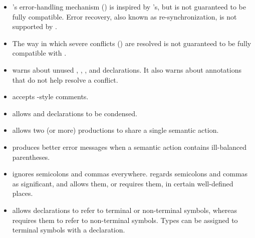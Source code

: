 \documentclass[onecolumn,11pt,nocopyrightspace,preprint]{sigplanconf}
\begin{document}
\begin{itemize}
\item \menhir's error-handling mechanism () is inspired
      by \ocamlyacc's, but is not guaranteed to be fully
      compatible. Error recovery, also known as re-synchronization, is not
      supported by \menhir.

\item The way in which severe conflicts () are resolved
      is not guaranteed to be fully compatible with \ocamlyacc.

\item \menhir warns about unused \dtoken, \dnonassoc, \dleft, and \dright
      declarations. It also warns about \dprec annotations that do not
      help resolve a conflict.

\item \menhir accepts \ocaml-style comments.

\item \menhir allows \dstart and \dtype declarations to be condensed.

\item \menhir allows two (or more) productions to share a single semantic action.

\item \menhir produces better error messages when a semantic action
      contains ill-balanced parentheses.


\item \ocamlyacc ignores semicolons and commas everywhere. \menhir regards
      semicolons and commas as significant, and allows them, or requires them,
      in certain well-defined places.


\item \ocamlyacc allows \dtype declarations to refer to terminal or non-terminal
      symbols, whereas \menhir requires them to refer to non-terminal symbols.
      Types can be assigned to terminal symbols with a \dtoken declaration.

\end{itemize}

\end{document}
